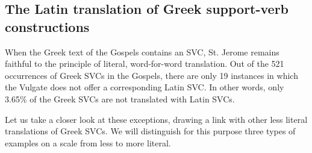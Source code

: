 \documentclass[output=paper,colorlinks,citecolor=brown]{langscibook}
\begin{document}

\subsection{The Latin translation of Greek support-verb constructions}\label{sec:bj:4:2}

When the Greek text of the Gospels contains an SVC, St. Jerome remains faithful to the
principle of literal, word-for-word translation. Out of the 521 occurrences of Greek SVCs
in the Gospels, there are only 19 instances in which the Vulgate does not offer a
corresponding Latin SVC. In other words, only 3.65\% of the Greek SVCs are not translated
with Latin SVCs.


Let us take a closer look at these exceptions, drawing a link with other less literal
translations of Greek SVCs. We will distinguish for this purpose three types of examples
on a scale from less to more literal.
\end{document}
